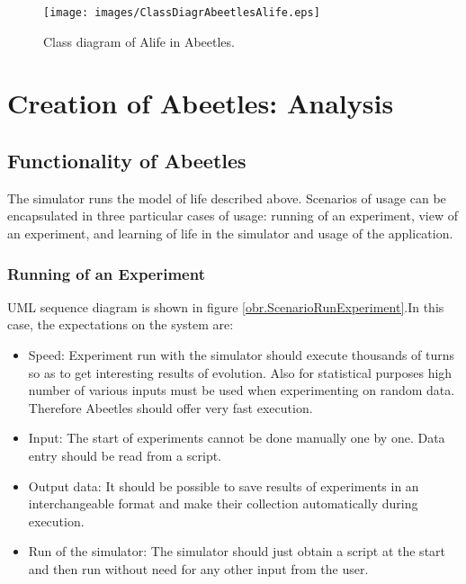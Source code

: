 \documentclass[a4paper,12pt]{report}
\begin{document}
\begin{figure}
\begin{center}
  \texttt{[image: images/ClassDiagrAbeetlesAlife.eps]}
  \caption{Class diagram of Alife in Abeetles.}
  \label{img.ClassDiagrAbeetlesAlife}
\end{center}
\end{figure}


\chapter{Creation of Abeetles: Analysis}%


\section{Functionality of Abeetles}

The simulator runs the model of life described above. Scenarios of usage can be encapsulated in three particular cases of usage: running of an experiment, view of an experiment, and learning of life in the simulator and usage of the application.

\subsection {Running of an Experiment}
UML sequence diagram is shown in figure \ref{obr.ScenarioRunExperiment}.In this case, the expectations on the system are:
\begin{itemize}
\item Speed: Experiment run with the simulator should execute thousands of turns so as to get interesting results of evolution. Also for statistical purposes high number of various inputs must be used when experimenting on random data. Therefore Abeetles should offer very fast execution. 
\item Input: The start of experiments cannot be done manually one by one. Data entry should be read from a script. 
\item Output data: It should be possible to save results of experiments in an interchangeable format and make their collection automatically during execution.
\item Run of the simulator: The simulator should just obtain a script at the start and then run without need for any other input from the user. 

\end{itemize}
\end{document}

